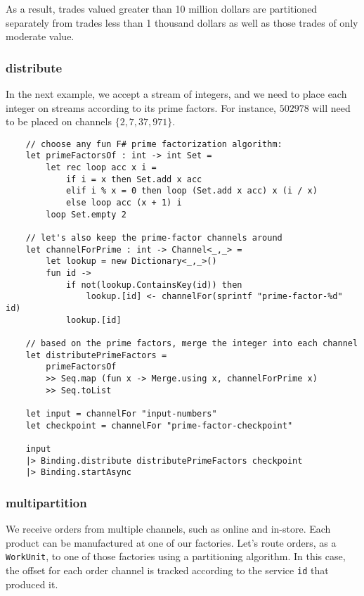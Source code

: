 \documentclass{article}
\begin{document}
As a result, trades valued greater than 10 million dollars are partitioned separately from trades less than 1 thousand dollars as well as those trades of only moderate value.

\subsubsection{distribute}

In the next example, we accept a stream of integers, and we need to place each integer on streams according to its prime factors.  For instance, $502978$ will need to be placed on channels $\{ 2, 7, 37, 971 \}$.

\begin{verbatim}
    // choose any fun F# prime factorization algorithm:
    let primeFactorsOf : int -> int Set =
        let rec loop acc x i = 
            if i = x then Set.add x acc
            elif i % x = 0 then loop (Set.add x acc) x (i / x)
            else loop acc (x + 1) i
        loop Set.empty 2

    // let's also keep the prime-factor channels around
    let channelForPrime : int -> Channel<_,_> =
        let lookup = new Dictionary<_,_>()
        fun id ->
            if not(lookup.ContainsKey(id)) then
                lookup.[id] <- channelFor(sprintf "prime-factor-%d" id)
            lookup.[id]

    // based on the prime factors, merge the integer into each channel
    let distributePrimeFactors =
        primeFactorsOf
        >> Seq.map (fun x -> Merge.using x, channelForPrime x)
        >> Seq.toList
    
    let input = channelFor "input-numbers"
    let checkpoint = channelFor "prime-factor-checkpoint"

    input
    |> Binding.distribute distributePrimeFactors checkpoint
    |> Binding.startAsync
\end{verbatim}

\subsubsection{multipartition}

We receive orders from multiple channels, such as online and in-store.  Each product can be manufactured at one of our factories.  Let's route orders, as a \texttt{WorkUnit}, to one of those factories using a partitioning algorithm.  In this case, the offset for each order channel is tracked according to the service \texttt{id} that produced it.
\end{document}
